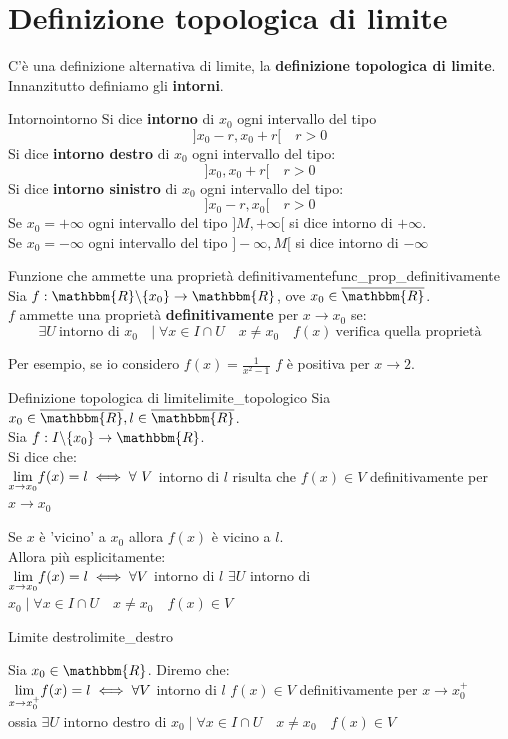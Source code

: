 \documentclass[12pt]{report}
\newcounter{definition}
\newcommand{\nmu}{}
\begin{document}
	\section{Definizione topologica di limite}
	C'è una definizione alternativa di limite, la \textbf{definizione topologica di limite}. \\
	Innanzitutto definiamo gli \textbf{intorni}.
	\begin{definition}{\nmu Intorno}{intorno}
		Si dice \textbf{intorno} di $x_0$ ogni intervallo del tipo \[
		]x_0 - r, x_0 + r[ \quad  r > 0\]
		Si dice \textbf{intorno destro} di $x_0$ ogni intervallo del tipo:
		\[
		]x_0, x_0 + r[ \quad r > 0
		\]
		Si dice \textbf{intorno sinistro} di $x_0$ ogni intervallo del tipo:
		\[
		]x_0 - r, x_0[ \quad r > 0
		\]
		Se $x_0 = +\infty$ ogni intervallo del tipo $]M, +\infty[$ si dice intorno di $+\infty$. \\
		Se $x_0 = -\infty$ ogni intervallo del tipo $]-\infty, M[$ si dice intorno di $-\infty$
	\end{definition}
	\begin{definition}{\nmu Funzione che ammette una proprietà definitivamente}{func_prop_definitivamente}
		Sia $f: \mathbbm{R}\backslash\{x_0\} \to \mathbbm{R}$, ove $x_0 \in \overline{\mathbbm{R}}$. \\
		$f$ ammette una proprietà \textbf{definitivamente} per $x \to x_0$ se:
		\[
		\exists U\ \text{intorno di $x_0$ } \mid \forall x \in I \cap U \quad x \neq x_0 \quad f(x)\ \text{verifica quella proprietà}
		\]
	\end{definition}
	Per esempio, se io considero $f(x) = \frac{1}{x^2 - 1}$ $f$ è positiva per $x \to 2$.
	\begin{definition}{\nmu Definizione topologica di limite}{limite_topologico}
		Sia $x_0 \in \overline{\mathbbm{R}}, l \in \overline{\mathbbm{R}}$. \\
		Sia $f: I \backslash \{x_0\}\to \mathbbm{R}$. \\
		Si dice che: \\
		$
		\mathlarger{\lim_{x \to x_0}}f(x) = l \iff \forall\ V$ intorno di $l$ risulta che  $f(x) \in V$ definitivamente per $x \to x_0$


		Se $x$ è 'vicino' a $x_0$ allora $f(x)$ è vicino a $l$. \\
		Allora più esplicitamente: \\
		$
		\mathlarger{\lim_{x \to x_0}}f(x) = l \iff \forall V$ intorno di $l$ $\exists U$ intorno di $x_0 \mid \forall x \in I \cap U \quad x \neq x_0 \quad f(x) \in V$
	\end{definition}
	\begin{definition}{\nmu Limite destro}{limite_destro}

		Sia $x_0 \in \mathbbm{R}$. Diremo che: \\
		$
		\mathlarger{\lim_{x \to x_0^+}}f(x) = l \iff \forall V$ intorno di $l$ $f(x) \in V$ definitivamente per $x \to x_0^+$ \\
		ossia $\exists U\text{ intorno destro di $x_0$} \mid \forall x \in I \cap U \quad x \neq x_0 \quad f(x) \in V$
	\end{definition}
\end{document}
